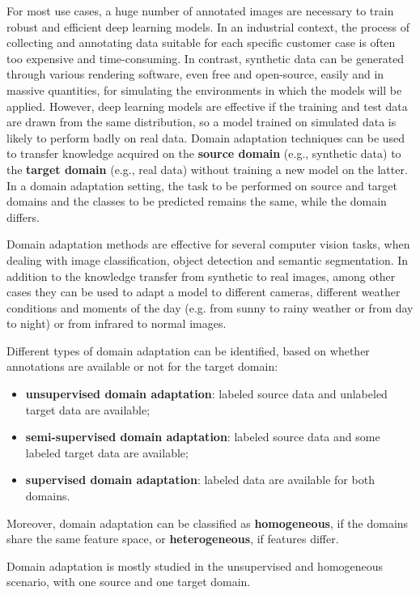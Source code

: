\documentclass[%
    corpo=12pt,
    twoside,
    stile=classica,   
    tipotesi=magistrale,
    evenboxes,
    english,
	numerazioneromana,
]{toptesi}
\begin{document}
For most use cases, a huge number of annotated images are necessary to train robust and efficient deep learning models. In an industrial context, the process of collecting and annotating data suitable for each specific customer case is often too expensive and time-consuming. In contrast, synthetic data can be generated through various rendering software, even free and open-source, easily and in massive quantities, for simulating the environments in which the models will be applied. However, deep learning models are effective if the training and test data are drawn from the same distribution, so a model trained on simulated data is likely to perform badly on real data. Domain adaptation techniques can be used to transfer knowledge acquired on the \textbf{source domain} (e.g., synthetic data) to the \textbf{target domain} (e.g., real data) without training a new model on the latter. In a domain adaptation setting, the task to be performed on source and target domains and the classes to be predicted remains the same, while the domain differs.

\bigskip
Domain adaptation methods are effective for several computer vision tasks, when dealing with image classification, object detection and semantic segmentation. In addition to the knowledge transfer from synthetic to real images, among other cases they can be used to adapt a model to different cameras, different weather conditions and moments of the day (e.g. from sunny to rainy weather or from day to night) or from infrared to normal images.

Different types of domain adaptation can be identified, based on whether annotations are available or not for the target domain:

\begin{itemize}
	\item \textbf{unsupervised domain adaptation}: labeled source data and unlabeled target data are available;
	\item \textbf{semi-supervised domain adaptation}: labeled source data and some labeled target data are available;
	\item \textbf{supervised domain adaptation}: labeled data are available for both domains.
\end{itemize}
Moreover, domain adaptation can be classified as \textbf{homogeneous}, if the domains share the same feature space, or \textbf{heterogeneous}, if features differ.

Domain adaptation is mostly studied in the unsupervised and homogeneous scenario, with one source and one target domain.
\end{document}

